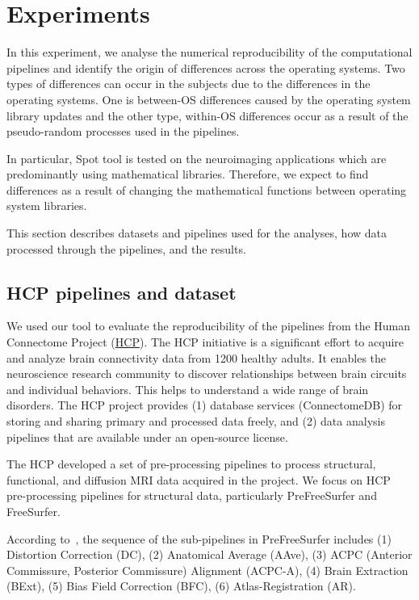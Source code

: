 \documentclass[a4paper,num-refs]{oup-contemporary}
\begin{document}
\section{Experiments}

In this experiment, we analyse the numerical reproducibility of the computational pipelines 
and identify the origin of differences across the operating systems. 
Two types of differences can occur in the subjects due to the differences
in the operating systems. One is between-OS differences caused by the
operating system library updates and the other type, within-OS differences
occur as a result of the pseudo-random processes used in the pipelines.

In particular, Spot tool is tested on the neuroimaging applications which are 
predominantly using mathematical libraries. Therefore, we expect to find 
differences as a result of changing the mathematical functions between operating system libraries.

This section describes datasets and pipelines used for the analyses, 
how data processed through the pipelines, and the results.


\subsection{HCP pipelines and dataset}

We used our tool to evaluate the reproducibility of the pipelines from the Human Connectome 
Project (\href{https://www.humanconnectome.org}{HCP}).
The HCP initiative is a significant effort to acquire and analyze 
brain connectivity data from 1200 healthy adults.
It enables the neuroscience 
research community to discover relationships between brain circuits and 
individual behaviors. This helps to understand a wide range of brain disorders.
The HCP project provides (1) database services (ConnectomeDB) for storing and 
sharing primary and processed data freely, and (2) data analysis pipelines that 
are available under an open-source license.

The HCP developed a set of pre-processing pipelines to process structural,
functional, and diffusion MRI data acquired in the project. We focus on HCP
pre-processing pipelines for structural data, particularly PreFreeSurfer
and FreeSurfer. 

According to~\cite{glasser2013}, the sequence of the 
sub-pipelines in PreFreeSurfer includes 
(1) Distortion Correction (DC), 
(2) Anatomical Average (AAve), 
(3) ACPC (Anterior Commissure, Posterior Commissure) Alignment (ACPC-A), 
(4) Brain Extraction (BExt), 
(5) Bias Field Correction (BFC), 
(6) Atlas-Registration (AR).
\end{document}
